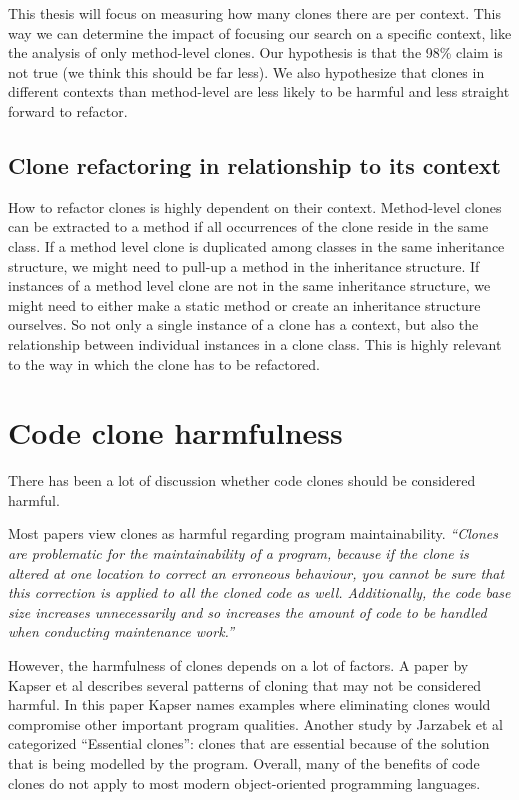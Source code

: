 This thesis will focus on measuring how many clones there are per context. This way we can determine the impact of focusing our search on a specific context, like the analysis of only method-level clones. Our hypothesis is that the 98\% claim is not true (we think this should be far less). We also hypothesize that clones in different contexts than method-level are less likely to be harmful and less straight forward to refactor.

\subsection{Clone refactoring in relationship to its context}
How to refactor clones is highly dependent on their context. Method-level clones can be extracted to a method \cite{kodhai2013method} if all occurrences of the clone reside in the same class. If a method level clone is duplicated among classes in the same inheritance structure, we might need to pull-up a method in the inheritance structure. If instances of a method level clone are not in the same inheritance structure, we might need to either make a static method or create an inheritance structure ourselves. So not only a single instance of a clone has a context, but also the relationship between individual instances in a clone class. This is highly relevant to the way in which the clone has to be refactored.

\section{Code clone harmfulness}
There has been a lot of discussion whether code clones should be considered harmful.

Most papers view clones as harmful regarding program maintainability. \textit{``Clones are problematic for the maintainability of a program, because if the clone is altered at one location to correct an erroneous behaviour, you cannot be sure that this correction is applied to all the cloned code as well. Additionally, the code base size increases unnecessarily and so increases the amount of code to be handled when conducting maintenance work.''} \cite{ostberg2014automatically}

However, the harmfulness of clones depends on a lot of factors. A paper by Kapser et al \cite{kapser2006cloning} describes several patterns of cloning that may not be considered harmful. In this paper Kapser names examples where eliminating clones would compromise other important program qualities. Another study by Jarzabek et al \cite{jarzabek2010clones} categorized ``Essential clones'': clones that are essential because of the solution that is being modelled by the program. Overall, many of the benefits of code clones do not apply to most modern object-oriented programming languages.

